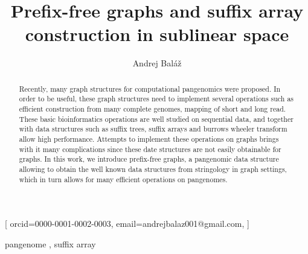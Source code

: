 \documentclass[twocolumn]{ceurart}
\begin{document}


\title{Prefix-free graphs and suffix array construction in sublinear space}

\author[1]{Andrej Baláž}[
orcid=0000-0001-0002-0003,
email=andrejbalaz001@gmail.com,
]
\cormark[1]
\address[1]{
    Faculty of Mathematics, Physics and Informatics,
    Comenius University, Mlynská dolina F1, 842 48 Bratislava, Slovakia
}


\begin{abstract}
  Recently, many graph structures for computational pangenomics were proposed.
  In order to be useful, these graph structures need to implement several
  operations such as efficient construction from many complete genomes,
  mapping of short and long read.
  These basic bioinformatics operations are well studied on sequential data,
  and together with data structures such as suffix trees, suffix arrays and 
  burrows wheeler transform allow high performance.
  Attempts to implement these operations on graphs brings with it many complications
  since these date structures are not easily obtainable for graphs.
  In this work, we introduce prefix-free graphs, a pangenomic data structure
  allowing to obtain the well known data structures from stringology in graph
  settings, which in turn allows for many efficient operations on pangenomes.
\end{abstract}

\begin{keywords}
  pangenome \sep
  suffix array
\end{keywords}

\maketitle
\end{document}
